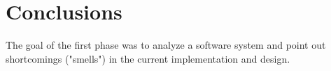 \chapter{Conclusions}
    $ $\\

The goal of the first phase was to analyze a software system and point out shortcomings 
("smells") in the current implementation and design.
